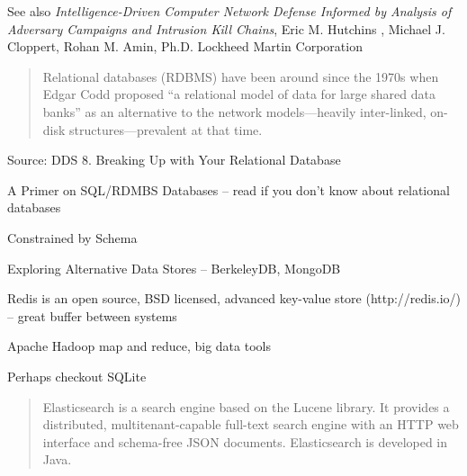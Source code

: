 \documentclass[Screen16to9,17pt]{foils}
\begin{document}


\begin{list2}
\item See also \emph{Intelligence-Driven Computer Network Defense Informed by Analysis of Adversary Campaigns and Intrusion Kill Chains}, Eric M. Hutchins , Michael J. Cloppert, Rohan M. Amin, Ph.D. Lockheed Martin Corporation\\{\footnotesize
 }
\end{list2}




\begin{quote}
Relational databases (RDBMS) have been around since the 1970s when Edgar Codd proposed “a relational model of data for large shared data banks” as an alternative to the network models—heavily inter-linked, on-disk structures—prevalent at that time.
\end{quote}
Source: DDS 8. Breaking Up with Your Relational Database

\begin{list2}
\item A Primer on SQL/RDMBS Databases -- read if you don't know about relational databases
\item Constrained by Schema
\item Exploring Alternative Data Stores -- BerkeleyDB, MongoDB
\item Redis is an open source, BSD licensed, advanced key-value store (http://redis.io/) -- great buffer between systems
\item Apache Hadoop  map and reduce, big data tools
\item Perhaps checkout SQLite  
\end{list2}



\begin{quote}
Elasticsearch is a search engine based on the Lucene library. It provides a distributed, multitenant-capable full-text search engine with an HTTP web interface and schema-free JSON documents. Elasticsearch is developed in Java.
\end{quote}
\end{document}
